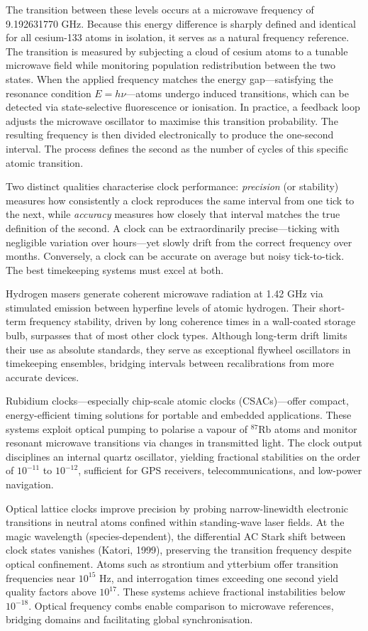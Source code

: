 The transition between these levels occurs at a microwave frequency of 9.192631770 GHz. Because this energy difference is sharply defined and identical for all cesium-133 atoms in isolation, it serves as a natural frequency reference. The transition is measured by subjecting a cloud of cesium atoms to a tunable microwave field while monitoring population redistribution between the two states. When the applied frequency matches the energy gap—satisfying the resonance condition $E = h\nu$—atoms undergo induced transitions, which can be detected via state-selective fluorescence or ionisation. In practice, a feedback loop adjusts the microwave oscillator to maximise this transition probability. The resulting frequency is then divided electronically to produce the one-second interval. The process defines the second as the number of cycles of this specific atomic transition. 

Two distinct qualities characterise clock performance: \emph{precision} (or stability) measures how consistently a clock reproduces the same interval from one tick to the next, while \emph{accuracy} measures how closely that interval matches the true definition of the second. A clock can be extraordinarily precise—ticking with negligible variation over hours—yet slowly drift from the correct frequency over months. Conversely, a clock can be accurate on average but noisy tick-to-tick. The best timekeeping systems must excel at both.

Hydrogen masers generate coherent microwave radiation at 1.42 GHz via stimulated emission between hyperfine levels of atomic hydrogen. Their short-term frequency stability, driven by long coherence times in a wall-coated storage bulb, surpasses that of most other clock types. Although long-term drift limits their use as absolute standards, they serve as exceptional flywheel oscillators in timekeeping ensembles, bridging intervals between recalibrations from more accurate devices.

Rubidium clocks—especially chip-scale atomic clocks (CSACs)—offer compact, energy-efficient timing solutions for portable and embedded applications. These systems exploit optical pumping to polarise a vapour of $^{87}$Rb atoms and monitor resonant microwave transitions via changes in transmitted light. The clock output disciplines an internal quartz oscillator, yielding fractional stabilities on the order of $10^{-11}$ to $10^{-12}$, sufficient for GPS receivers, telecommunications, and low-power navigation.

Optical lattice clocks improve precision by probing narrow-linewidth electronic transitions in neutral atoms confined within standing-wave laser fields. At the \QSOpen{}magic wavelength\QSClose{} (species-dependent), the differential AC Stark shift between clock states vanishes (Katori, 1999), preserving the transition frequency despite optical confinement. Atoms such as strontium and ytterbium offer transition frequencies near $10^{15}$ Hz, and interrogation times exceeding one second yield quality factors above $10^{17}$. These systems achieve fractional instabilities below $10^{-18}$. Optical frequency combs enable comparison to microwave references, bridging domains and facilitating global synchronisation.

